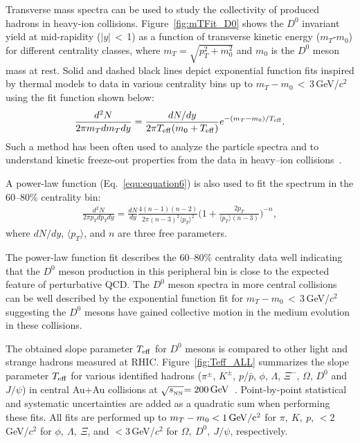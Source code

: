 \documentclass[%
 reprint,	
showpacs,
 amsmath,amssymb,
 aps,
 prc,
]{revtex4-1}
\begin{document}
Transverse mass spectra can be used to study the collectivity of produced hadrons in heavy-ion collisions. Figure~\ref{fig:mTFit_D0} shows the $D^{0}$ invariant yield at mid-rapidity ($|y|$\,$<$\,1) as a function of transverse kinetic energy ($m_{T}$-$m_{0}$) for different centrality classes, where $m_{T} = \sqrt{p_{T}^2+m_0^2}$ and $m_0$ is the $D^0$ meson mass at rest. Solid and dashed black lines depict exponential function fits inspired by thermal models to data in various centrality bins up to $m_{T}-m_{0}$\,$<$\,3\,GeV/$c^2$ using the fit function shown below:
\begin{equation}
  \begin{aligned}
\frac{d^2N}{2\pi m_{T}dm_{T}dy} = \frac{dN/dy}{2\pi T_{\rm eff}(m_0+T_{\rm eff})}e^{-(m_{T}-m_0)/T_{\rm eff}}.
  \end{aligned}
\label{equ:equation5}
\end{equation}
Such a method has been often used to analyze the particle spectra and to understand kinetic freeze-out properties from the data in heavy--ion collisions~\cite{Kaneta:1999lnf,StarWhitePaper}.


A power-law function (Eq.~\ref{equ:equation6}) is also used to fit the spectrum in the 60--80\% centrality bin:
\begin{equation}
  \begin{aligned}
\frac{d^2N}{2\pi p_{T}dp_{T}dy} = \frac{dN}{dy}\frac{4(n-1)(n-2)}{2\pi (n-3)^2\langle p_{T} \rangle ^2}\bigg(1+\frac{2p_{T}}{\langle p_{T} \rangle (n-3)}\bigg)^{-n},
  \end{aligned}
\label{equ:equation6}
\end{equation}
where $dN/dy$, $\langle p_{T}\rangle$, and $n$ are three free parameters.

The power-law function fit describes the 60--80\% centrality data well indicating that the $D^0$ meson production in this peripheral bin is close to the expected feature of perturbative QCD. The $D^0$ meson spectra in more central collisions can be well described by the exponential function fit for $m_{T}-m_{0}$\,$<$\,3\,GeV/$c^2$ suggesting the $D^0$ mesons have gained collective motion in the medium evolution in these collisions.


The obtained slope parameter $T_{\rm eff}$ for $D^0$ mesons is compared to other light and strange hadrons measured at RHIC. 
Figure~\ref{fig:Teff_ALL} summarizes the slope parameter $T_{\rm eff}$ for various identified hadrons ($\pi^{\pm}$, $K^{\pm}$, $p$/$\bar{p}$, $\phi$, $\Lambda$, $\Xi^-$, $\Omega$, $D^0$ and $J/\psi$) in central Au+Au collisions at $\sqrt{s_{_{\rm NN}}} {\rm = 200\,GeV}$~\cite{Adams:2003xp,Abelev:2007rw,Adams:2006ke,Adamczyk:2013tvk}. Point-by-point statistical and systematic uncertainties are added as a quadratic sum when performing these fits. All fits are performed up to $m_{T} - m_{0} <1\,\rm{GeV}/c^2$ for $\pi,\ K,\ p$, $<2$\,GeV/$c^2$ for $\phi,\ \Lambda,\ \Xi$, and $<3$\,GeV/$c^2$ for $\Omega,\ D^{0},\ J/\psi$, respectively. 
\end{document}
